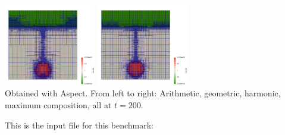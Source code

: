 \begin{center}
\includegraphics[width=4cm]{images/stokes_sphere_fs2D/aspects/rho_h}
\includegraphics[width=4cm]{images/stokes_sphere_fs2D/aspects/rho_m}\\
{\captionfont Obtained with Aspect. From left to right: Arithmetic, geometric, harmonic, maximum 
composition, all at $t=200$.}
\end{center}


\newpage

This is the \aspect input file for this benchmark:
 


